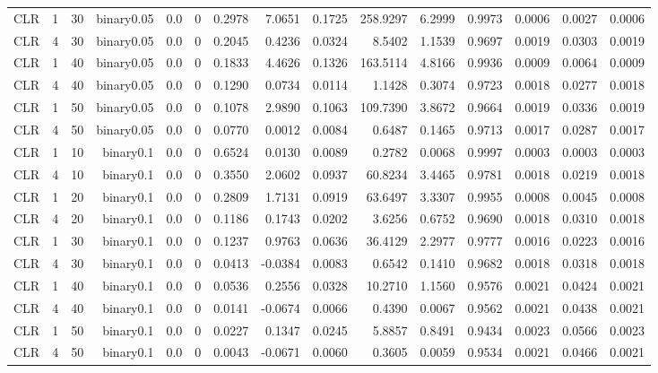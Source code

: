 \begin{longtable}{rrrrrrrrrrrrrrr}
  CLR & 1 & 30 & binary0.05 & 0.0 & 0 & 0.2978 & 7.0651 & 0.1725 & 258.9297 & 6.2999 & 0.9973 & 0.0006 & 0.0027 & 0.0006 \\ 
  CLR & 4 & 30 & binary0.05 & 0.0 & 0 & 0.2045 & 0.4236 & 0.0324 & 8.5402 & 1.1539 & 0.9697 & 0.0019 & 0.0303 & 0.0019 \\ 
  CLR & 1 & 40 & binary0.05 & 0.0 & 0 & 0.1833 & 4.4626 & 0.1326 & 163.5114 & 4.8166 & 0.9936 & 0.0009 & 0.0064 & 0.0009 \\ 
  CLR & 4 & 40 & binary0.05 & 0.0 & 0 & 0.1290 & 0.0734 & 0.0114 & 1.1428 & 0.3074 & 0.9723 & 0.0018 & 0.0277 & 0.0018 \\ 
  CLR & 1 & 50 & binary0.05 & 0.0 & 0 & 0.1078 & 2.9890 & 0.1063 & 109.7390 & 3.8672 & 0.9664 & 0.0019 & 0.0336 & 0.0019 \\ 
  CLR & 4 & 50 & binary0.05 & 0.0 & 0 & 0.0770 & 0.0012 & 0.0084 & 0.6487 & 0.1465 & 0.9713 & 0.0017 & 0.0287 & 0.0017 \\ 
  CLR & 1 & 10 & binary0.1 & 0.0 & 0 & 0.6524 & 0.0130 & 0.0089 & 0.2782 & 0.0068 & 0.9997 & 0.0003 & 0.0003 & 0.0003 \\ 
  CLR & 4 & 10 & binary0.1 & 0.0 & 0 & 0.3550 & 2.0602 & 0.0937 & 60.8234 & 3.4465 & 0.9781 & 0.0018 & 0.0219 & 0.0018 \\ 
  CLR & 1 & 20 & binary0.1 & 0.0 & 0 & 0.2809 & 1.7131 & 0.0919 & 63.6497 & 3.3307 & 0.9955 & 0.0008 & 0.0045 & 0.0008 \\ 
  CLR & 4 & 20 & binary0.1 & 0.0 & 0 & 0.1186 & 0.1743 & 0.0202 & 3.6256 & 0.6752 & 0.9690 & 0.0018 & 0.0310 & 0.0018 \\ 
  CLR & 1 & 30 & binary0.1 & 0.0 & 0 & 0.1237 & 0.9763 & 0.0636 & 36.4129 & 2.2977 & 0.9777 & 0.0016 & 0.0223 & 0.0016 \\ 
  CLR & 4 & 30 & binary0.1 & 0.0 & 0 & 0.0413 & -0.0384 & 0.0083 & 0.6542 & 0.1410 & 0.9682 & 0.0018 & 0.0318 & 0.0018 \\ 
  CLR & 1 & 40 & binary0.1 & 0.0 & 0 & 0.0536 & 0.2556 & 0.0328 & 10.2710 & 1.1560 & 0.9576 & 0.0021 & 0.0424 & 0.0021 \\ 
  CLR & 4 & 40 & binary0.1 & 0.0 & 0 & 0.0141 & -0.0674 & 0.0066 & 0.4390 & 0.0067 & 0.9562 & 0.0021 & 0.0438 & 0.0021 \\ 
  CLR & 1 & 50 & binary0.1 & 0.0 & 0 & 0.0227 & 0.1347 & 0.0245 & 5.8857 & 0.8491 & 0.9434 & 0.0023 & 0.0566 & 0.0023 \\ 
  CLR & 4 & 50 & binary0.1 & 0.0 & 0 & 0.0043 & -0.0671 & 0.0060 & 0.3605 & 0.0059 & 0.9534 & 0.0021 & 0.0466 & 0.0021 \\ 

\end{longtable}
